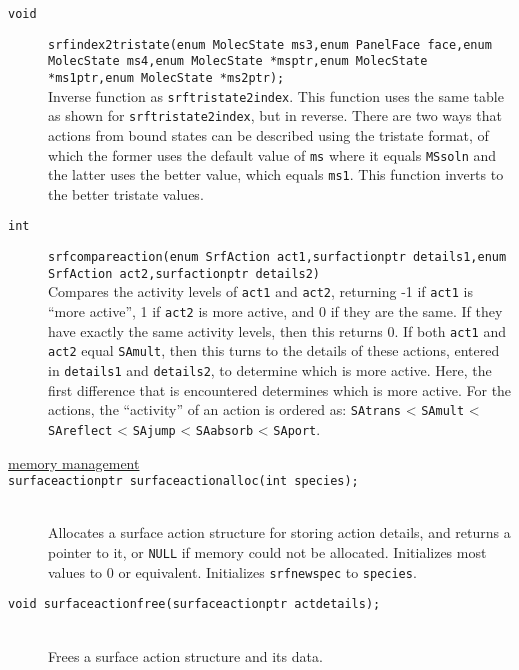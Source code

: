 \documentclass {book}
\begin{document}
\begin{description}
\item[\texttt{void}]
\texttt{srfindex2tristate(enum MolecState ms3,enum PanelFace face,enum MolecState ms4,enum MolecState *msptr,enum MolecState *ms1ptr,enum MolecState *ms2ptr);}
\hfill \\
Inverse function as \texttt{srftristate2index}. This function uses the same table as shown for \texttt{srftristate2index}, but in reverse. There are two ways that actions from bound states can be described using the tristate format, of which the former uses the default value of \texttt{ms} where it equals \texttt{MSsoln} and the latter uses the better value, which equals \texttt{ms1}. This function inverts to the better tristate values.

\item[\texttt{int}]
\texttt{srfcompareaction(enum SrfAction act1,surfactionptr details1,enum SrfAction act2,surfactionptr details2)}
\hfill \\
Compares the activity levels of \texttt{act1} and \texttt{act2}, returning -1 if \texttt{act1} is ``more active'', 1 if \texttt{act2} is more active, and 0 if they are the same. If they have exactly the same activity levels, then this returns 0. If both \texttt{act1} and \texttt{act2} equal \texttt{SAmult}, then this turns to the details of these actions, entered in \texttt{details1} and \texttt{details2}, to determine which is more active. Here, the first difference that is encountered determines which is more active. For the actions, the ``activity'' of an action is ordered as: \texttt{SAtrans} < \texttt{SAmult} < \texttt{SAreflect} < \texttt{SAjump} < \texttt{SAabsorb} < \texttt{SAport}.

\item[\underline{memory management}]

\item[\texttt{surfaceactionptr surfaceactionalloc(int species);}]
\hfill \\
Allocates a surface action structure for storing action details, and returns a pointer to it, or \texttt{NULL} if memory could not be allocated. Initializes most values to 0 or equivalent. Initializes \texttt{srfnewspec} to \texttt{species}.

\item[\texttt{void surfaceactionfree(surfaceactionptr actdetails);}]
\hfill \\
Frees a surface action structure and its data.


\end{description}
\end{document}
